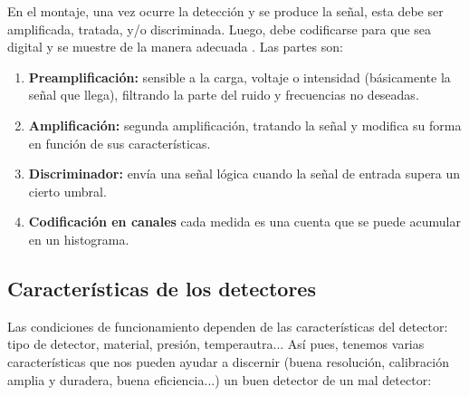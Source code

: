 En el montaje, una vez ocurre la detección y se produce la señal, esta debe ser amplificada, tratada, y/o discriminada. Luego, debe codificarse para que sea digital y se muestre de la manera adecuada . Las partes son: 

\begin{enumerate}
    \item \textbf{Preamplificación:} sensible a la carga, voltaje o intensidad (básicamente la señal que llega), filtrando la parte del ruido y frecuencias no deseadas. 
    \item \textbf{Amplificación:} segunda amplificación, tratando la señal y modifica su forma en función de sus características.
    \item \textbf{Discriminador:} envía una señal lógica cuando la señal de entrada supera un cierto umbral.
    \item \textbf{Codificación en canales} cada medida es una cuenta que se puede acumular en un histograma. 
\end{enumerate}


\subsection{Características de los detectores}

Las condiciones de funcionamiento dependen de las características del detector: tipo de detector, material, presión, temperautra... Así pues, tenemos varias características que nos pueden ayudar a discernir (buena resolución, calibración amplia y duradera, buena eficiencia...) un buen detector de un mal detector:

